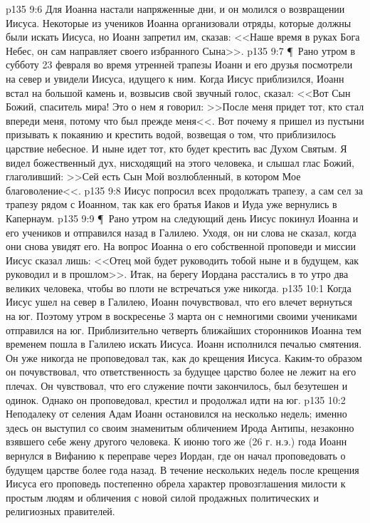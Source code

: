\vs p135 9:6 Для Иоанна настали напряженные дни, и он молился о возвращении Иисуса. Некоторые из учеников Иоанна организовали отряды, которые должны были искать Иисуса, но Иоанн запретил им, сказав: <<Наше время в руках Бога Небес, он сам направляет своего избранного Сына>>.
\vs p135 9:7 \P\ Рано утром в субботу 23 февраля во время утренней трапезы Иоанн и его друзья посмотрели на север и увидели Иисуса, идущего к ним. Когда Иисус приблизился, Иоанн встал на большой камень и, возвысив свой звучный голос, сказал: <<Вот Сын Божий, спаситель мира! Это о нем я говорил: >>После меня придет тот, кто стал впереди меня, потому что был прежде меня<<. Вот почему я пришел из пустыни призывать к покаянию и крестить водой, возвещая о том, что приблизилось царствие небесное. И ныне идет тот, кто будет крестить вас Духом Святым. Я видел божественный дух, нисходящий на этого человека, и слышал глас Божий, глаголивший: >>Сей есть Сын Мой возлюбленный, в котором Мое благоволение<<.
\vs p135 9:8 Иисус попросил всех продолжать трапезу, а сам сел за трапезу рядом с Иоанном, так как его братья Иаков и Иуда уже вернулись в Капернаум.
\vs p135 9:9 \P\ Рано утром на следующий день Иисус покинул Иоанна и его учеников и отправился назад в Галилею. Уходя, он ни слова не сказал, когда они снова увидят его. На вопрос Иоанна о его собственной проповеди и миссии Иисус сказал лишь: <<Отец мой будет руководить тобой ныне и в будущем, как руководил и в прошлом>>. Итак, на берегу Иордана расстались в то утро два великих человека, чтобы во плоти не встречаться уже никогда.
\vs p135 10:1 Когда Иисус ушел на север в Галилею, Иоанн почувствовал, что его влечет вернуться на юг. Поэтому утром в воскресенье 3 марта он с немногими своими учениками отправился на юг. Приблизительно четверть ближайших сторонников Иоанна тем временем пошла в Галилею искать Иисуса. Иоанн исполнился печалью смятения. Он уже никогда не проповедовал так, как до крещения Иисуса. Каким\hyp{}то образом он почувствовал, что ответственность за будущее царство более не лежит на его плечах. Он чувствовал, что его служение почти закончилось, был безутешен и одинок. Однако он проповедовал, крестил и продолжал идти на юг.
\vs p135 10:2 Неподалеку от селения Адам Иоанн остановился на несколько недель; именно здесь он выступил со своим знаменитым обличением Ирода Антипы, незаконно взявшего себе жену другого человека. К июню того же (26 г. н.э.) года Иоанн вернулся в Вифанию к переправе через Иордан, где он начал проповедовать о будущем царстве более года назад. В течение нескольких недель после крещения Иисуса его проповедь постепенно обрела характер провозглашения милости к простым людям и обличения с новой силой продажных политических и религиозных правителей.
